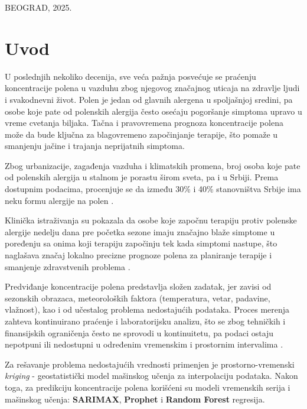 \documentclass[12pt]{article}
\begin{document}
\begin{center}
\normalsize	 BEOGRAD,  2025.
\end{center}

\mbox{}
\newpage
\thispagestyle{empty}
\tableofcontents
\thispagestyle{empty}
\mbox{}
\newpage

\section{Uvod}
\setcounter{page}{1}
\hspace*{\parindent}
U poslednjih nekoliko decenija, sve veća pažnja posvećuje se praćenju koncentracije polena u vazduhu zbog njegovog značajnog uticaja na zdravlje ljudi i svakodnevni život. Polen je jedan od glavnih alergena u spoljašnjoj sredini, pa osobe koje pate od polenskih alergija često osećaju pogoršanje simptoma upravo u vreme cvetanja biljaka. Tačna i pravovremena prognoza koncentracije polena može da bude ključna za blagovremeno započinjanje terapije, što pomaže u smanjenju jačine i trajanja neprijatnih simptoma.

Zbog urbanizacije, zagađenja vazduha i klimatskih promena, broj osoba koje pate od polenskih alergija u stalnom je porastu širom sveta, pa i u Srbiji. Prema dostupnim podacima, procenjuje se da između 30\% i 40\% stanovništva Srbije ima neku formu alergije na polen \cite{bionette2023, drugacijipristup2025}.

Klinička istraživanja su pokazala da osobe koje započnu terapiju protiv polenske alergije nedelju dana pre početka sezone imaju značajno blaže simptome u poređenju sa onima koji terapiju započinju tek kada simptomi nastupe, što naglašava značaj lokalno precizne prognoze polena za planiranje terapije i smanjenje zdravstvenih problema \cite{omalizumab2022, birch2019}.

Predviđanje koncentracije polena predstavlja složen zadatak, jer zavisi od sezonskih obrazaca, meteoroloških faktora (temperatura, vetar, padavine, vlažnost), kao i od učestalog problema nedostajućih podataka. Proces merenja zahteva kontinuirano praćenje i laboratorijsku analizu, što se zbog tehničkih i finansijskih ograničenja često ne sprovodi u kontinuitetu, pa podaci ostaju nepotpuni ili nedostupni u određenim vremenskim i prostornim intervalima \cite{minic2020, sofia2023}.

Za rešavanje problema nedostajućih vrednosti primenjen je prostorno-vremenski \textit{kriging} - geostatistički model mašinskog učenja za interpolaciju podataka. Nakon toga, za predikciju koncentracije polena korišćeni su modeli vremenskih serija i mašinskog učenja: \textbf{SARIMAX}, \textbf{Prophet} i \textbf{Random Forest} regresija.
\end{document}
